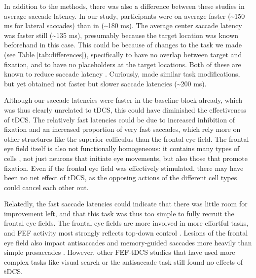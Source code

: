 \documentclass[11pt,]{memoir}
\begin{document}
In addition to the methods, there was also a difference between these studies in average saccade latency. In our study, participants were on average faster (\textasciitilde{}150 ms for lateral saccades) than in \textcite{Kanai2012} (\textasciitilde{}180 ms). The average center saccade latency was faster still (\textasciitilde{}135 ms), presumably because the target location was known beforehand in this case. This could be because of changes to the task we made (see Table \ref{tab:differences}), specifically to have no overlap between target and fixation, and to have no placeholders at the target locations. Both of these are known to reduce saccade latency \autocite{Sumner2011}. Curiously, \textcite{Chen2017} made similar task modifications, but yet obtained not faster but slower saccade latencies (\textasciitilde{}200 ms).

Although our saccade latencies were faster in the baseline block already, which was thus clearly unrelated to tDCS, this could have diminished the effectiveness of tDCS. The relatively fast latencies could be due to increased inhibition of fixation and an increased proportion of very fast saccades, which rely more on other structures like the superior colliculus \autocites{Munoz1992}{Munoz2002} than the frontal eye field. The frontal eye field itself is also not functionally homogeneous: it contains many types of cells \autocite{Lowe2017}, not just neurons that initiate eye movements, but also those that promote fixation. Even if the frontal eye field was effectively stimulated, there may have been no net effect of tDCS, as the opposing actions of the different cell types could cancel each other out.

Relatedly, the fast saccade latencies could indicate that there was little room for improvement left, and that this task was thus too simple to fully recruit the frontal eye fields. The frontal eye fields are more involved in more effortful tasks, and FEF activity most strongly reflects top-down control \autocite{Schafer2011}. Lesions of the frontal eye field also impact antisaccades and memory-guided saccades more heavily than simple prosaccades \autocite{Rivaud1994}. However, other FEF-tDCS studies that have used more complex tasks like visual search \autocites{Ball2013}{Ellison2017} or the antisaccade task \autocite{Chen2017} still found no effects of tDCS.
\end{document}

